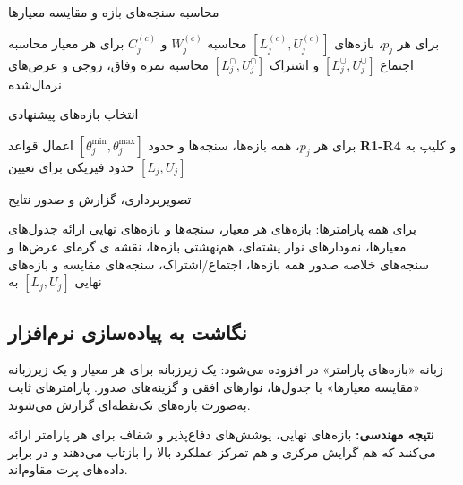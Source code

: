\begin{algorithm}[H]
\caption{محاسبه سنجه‌های بازه و مقایسه معیارها}
\begin{algorithmic}[1]
\REQUIRE برای هر $p_j$، بازه‌های $[L^{(c)}_j,U^{(c)}_j]$
    \STATE محاسبه $W^{(c)}_j$ و $C^{(c)}_j$ برای هر معیار
    \STATE محاسبه اجتماع $[L^{\cup}_j,U^{\cup}_j]$ و اشتراک $[L^{\cap}_j,U^{\cap}_j]$
    \STATE محاسبه نمره وفاق،  زوجی و عرض‌های نرمال‌شده
\ENDFOR
\end{algorithmic}
\end{algorithm}

\begin{algorithm}[H]
\caption{انتخاب بازه‌های پیشنهادی}
\begin{algorithmic}[1]
\REQUIRE برای هر $p_j$، همه بازه‌ها، سنجه‌ها و حدود $[\theta_j^{\min}, \theta_j^{\max}]$
    \STATE اعمال قواعد \textbf{R1-R4} و کلیپ به حدود فیزیکی برای تعیین $[L_j,U_j]$
\ENDFOR
\end{algorithmic}
\end{algorithm}

\begin{algorithm}[H]
\caption{تصویربرداری، گزارش و صدور نتایج}
\begin{algorithmic}[1]
\REQUIRE برای همه پارامترها: بازه‌های هر معیار، سنجه‌ها و بازه‌های نهایی
\STATE ارائه جدول‌های معیارها، نمودارهای نوار پشته‌ای، هم‌نهشتی بازه‌ها، نقشه ی گرمای عرض‌ها و سنجه‌های خلاصه
\STATE صدور همه بازه‌ها، اجتماع/اشتراک، سنجه‌های مقایسه و بازه‌های نهایی $[L_j,U_j]$ به 
\end{algorithmic}
\end{algorithm}

\subsection{نگاشت به پیاده‌سازی نرم‌افزار}
زبانه «بازه‌های پارامتر» در  افزوده می‌شود: یک زیرزبانه برای هر معیار و یک زیرزبانه «مقایسه معیارها» با جدول‌ها، نوارهای افقی و گزینه‌های صدور. پارامترهای ثابت به‌صورت بازه‌های تک‌نقطه‌ای گزارش می‌شوند.

\vspace{0.5em}
\noindent\textbf{نتیجه مهندسی:} بازه‌های نهایی، پوشش‌های دفاع‌پذیر و شفاف برای هر پارامتر  ارائه می‌کنند که هم گرایش مرکزی و هم تمرکز عملکرد بالا را بازتاب می‌دهند و در برابر داده‌های پرت مقاوم‌اند.


